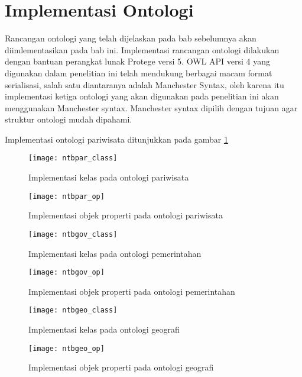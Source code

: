 \section{Implementasi Ontologi}
Rancangan ontologi yang telah dijelaskan pada bab sebelumnya akan diimlementasikan pada bab ini. Implementasi rancangan ontologi dilakukan dengan bantuan perangkat lunak Protege versi 5. OWL API versi 4 yang digunakan dalam penelitian ini telah mendukung berbagai macam format serialisasi, salah satu diantaranya adalah Manchester Syntax, oleh karena itu implementasi ketiga ontologi yang akan digunakan pada penelitian ini akan menggunakan Manchester syntax. Manchester syntax dipilih dengan tujuan agar struktur ontologi mudah dipahami.

Implementasi ontologi pariwisata ditunjukkan pada gambar \ref{fig:ntbpar_class}
\begin{figure}[h]
	\centering
	\texttt{[image: ntbpar\_class]}
	\caption{Implementasi kelas pada ontologi pariwisata}
	\label{fig:ntbpar_class}
\end{figure}

\begin{figure}[h]
	\centering
	\texttt{[image: ntbpar\_op]}
	\caption{Implementasi objek properti pada ontologi pariwisata}
	\label{fig:ntbpar_op}
\end{figure}

\begin{figure}[h]
	\centering
	\texttt{[image: ntbgov\_class]}
	\caption{Implementasi kelas pada ontologi pemerintahan}
	\label{fig:ntbgov_class}
\end{figure}

\begin{figure}[h]
	\centering
	\texttt{[image: ntbgov\_op]}
	\caption{Implementasi objek properti pada ontologi pemerintahan}
	\label{fig:ntbgov_op}
\end{figure}

\begin{figure}[h]
	\centering
	\texttt{[image: ntbgeo\_class]}
	\caption{Implementasi kelas pada ontologi geografi}
	\label{fig:ntbgeo_class}
\end{figure}

\begin{figure}[h]
	\centering
	\texttt{[image: ntbgeo\_op]}
	\caption{Implementasi objek properti pada ontologi geografi}
	\label{fig:ntbgov_op}
\end{figure}

